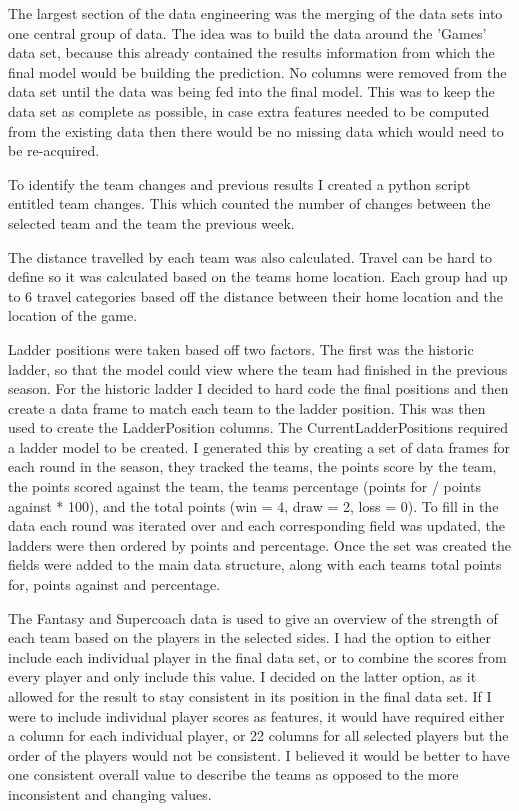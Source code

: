 \documentclass{imc-inf}
\begin{document}
	The largest section of the data engineering was the merging of the data sets into one central group of data. The idea was to build the data around the 'Games' data set, because this already contained the results information from which the final model would be building the prediction. No columns were removed from the data set until the data was being fed into the final model. This was to keep the data set as complete as possible, in case extra features needed to be computed from the existing data then there would be no missing data which would need to be re-acquired. 
	
	To identify the team changes and previous results I created a python script entitled team changes. This which counted the number of changes between the selected team and the team the previous week.

	The distance travelled by each team was also calculated. Travel can be hard to define so it was calculated based on the teams home location. Each group had up to 6 travel categories based off the distance between their home location and the location of the game. 
	
	Ladder positions were taken based off two factors. The first was the historic ladder, so that the model could view where the team had finished in the previous season. For the historic ladder I decided to hard code the final positions and then create a data frame to match each team to the ladder position. This was then used to create the LadderPosition columns. The CurrentLadderPositions required a ladder model to be created. I generated this by creating a set of data frames for each round in the season, they tracked the teams, the points score by the team, the points scored against the team, the teams percentage (points for / points against * 100), and the total points (win = 4, draw = 2, loss = 0). To fill in the data each round was iterated over and each corresponding field was updated, the ladders were then ordered by points and percentage. Once the set was created the fields were added to the main data structure, along with each teams total points for, points against and percentage.
		
	The Fantasy and Supercoach data is used to give an overview of the strength of each team based on the players in the selected sides. I had the option to either include each individual player in the final data set, or to combine the scores from every player and only include this value. I decided on the latter option, as it allowed for the result to stay consistent in its position in the final data set. If I were to include individual player scores as features, it would have required either a column for each individual player, or 22 columns for all selected players but the order of the players would not be consistent. I believed it would be better to have one consistent overall value to describe the teams as opposed to the more inconsistent and changing values.
	
\end{document}
